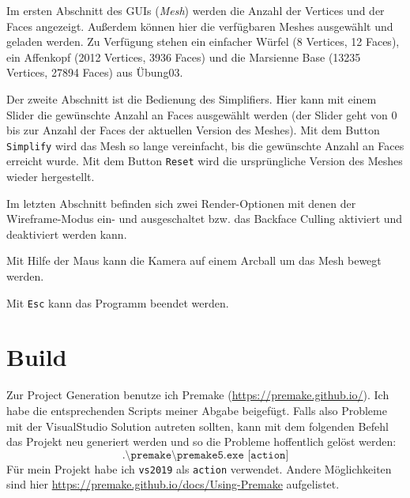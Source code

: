 \documentclass[a4paper,12pt]{book}
\begin{document}
Im ersten Abschnitt des GUIs (\emph{Mesh}) werden die Anzahl der Vertices und der Faces angezeigt. Außerdem können hier die verfügbaren Meshes ausgewählt und geladen werden. Zu Verfügung stehen ein einfacher Würfel (8 Vertices, 12 Faces), ein Affenkopf (2012 Vertices, 3936 Faces) und die Marsienne Base (13235 Vertices, 27894 Faces) aus Übung03.

Der zweite Abschnitt ist die Bedienung des Simplifiers. Hier kann mit einem Slider die gewünschte Anzahl an Faces ausgewählt werden (der Slider geht von 0 bis zur Anzahl der Faces der aktuellen Version des Meshes). Mit dem Button \texttt{Simplify} wird das Mesh so lange vereinfacht, bis die gewünschte Anzahl an Faces erreicht wurde. Mit dem Button \texttt{Reset} wird die ursprüngliche Version des Meshes wieder hergestellt.

Im letzten Abschnitt befinden sich zwei Render-Optionen mit denen der Wireframe-Modus ein- und ausgeschaltet bzw. das Backface Culling aktiviert und deaktiviert werden kann.

Mit Hilfe der Maus kann die Kamera auf einem Arcball um das Mesh bewegt werden.

Mit \texttt{Esc} kann das Programm beendet werden.

\section*{Build}

Zur Project Generation benutze ich Premake (\url{https://premake.github.io/}). Ich habe die entsprechenden Scripts meiner Abgabe beigefügt.
Falls also Probleme mit der VisualStudio Solution autreten sollten,
kann mit dem folgenden Befehl das Projekt neu generiert werden und so die Probleme hoffentlich gelöst werden:
\[\texttt{.\textbackslash premake\textbackslash premake5.exe [action]}\]
Für mein Projekt habe ich \texttt{vs2019} als \texttt{action} verwendet. Andere Möglichkeiten sind hier \url{https://premake.github.io/docs/Using-Premake} aufgelistet.
\end{document}
